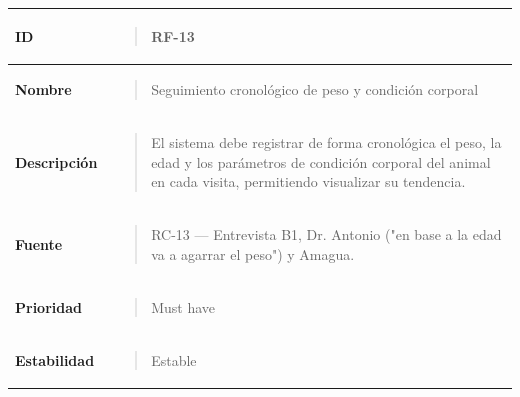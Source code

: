 \documentclass[
]{article}
\newcounter{none} %
\begin{document}
{\def\LTcaptype{none} %
\begin{longtable}[]{@{}
  >{\raggedright\arraybackslash}p{}
  >{\raggedright\arraybackslash}p{}@{}}
\toprule\noalign{}
\begin{minipage}[b]{\linewidth}\raggedright
\textbf{ID}
\end{minipage} & \begin{minipage}[b]{\linewidth}\raggedright
\begin{quote}
RF-13
\end{quote}
\end{minipage} \\
\midrule\noalign{}
\endhead
\bottomrule\noalign{}
\endlastfoot
\textbf{Nombre} & \begin{minipage}[t]{\linewidth}\raggedright
\begin{quote}
Seguimiento cronológico de peso y condición corporal
\end{quote}
\end{minipage} \\
\textbf{Descripción} & \begin{minipage}[t]{\linewidth}\raggedright
\begin{quote}
El sistema debe registrar de forma cronológica el peso, la edad y los
parámetros de condición corporal del animal en cada visita, permitiendo
visualizar su tendencia.
\end{quote}
\end{minipage} \\
\textbf{Fuente} & \begin{minipage}[t]{\linewidth}\raggedright
\begin{quote}
RC-13 --- Entrevista B1, Dr. Antonio ("en base a la edad va a agarrar el
peso") y Amagua.
\end{quote}
\end{minipage} \\
\textbf{Prioridad} & \begin{minipage}[t]{\linewidth}\raggedright
\begin{quote}
Must have
\end{quote}
\end{minipage} \\
\textbf{Estabilidad} & \begin{minipage}[t]{\linewidth}\raggedright
\begin{quote}
Estable
\end{quote}
\end{minipage} \\

\end{longtable}}
\end{document}
